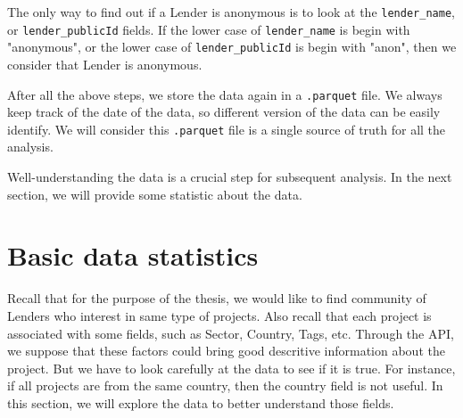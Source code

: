 
The only way to find out if a Lender is anonymous is to look at the \lstinline|lender_name|,
or \lstinline|lender_publicId| fields.
If the lower case of \lstinline|lender_name| is begin with "anonymous",
or the lower case of \lstinline|lender_publicId| is begin with "anon",
then we consider that Lender is anonymous.


After all the above steps, we store the data again in a \lstinline|.parquet| file.
We always keep track of the date of the data, so different version of the data can be easily identify.
We will consider this \lstinline|.parquet| file is a single source of truth for all the analysis.

Well-understanding the data is a crucial step for subsequent analysis.
In the next section, we will provide some statistic about the data.

\section{Basic data statistics}

Recall that for the purpose of the thesis, we would like to find community of Lenders who interest in same type of projects.
Also recall that each project is associated with some fields, such as Sector, Country, Tags, etc.
Through the API, we suppose that these factors could bring good descritive information about the project.
But we have to look carefully at the data to see if it is true.
For instance, if all projects are from the same country, then the country field is not useful.
In this section, we will explore the data to better understand those fields.

